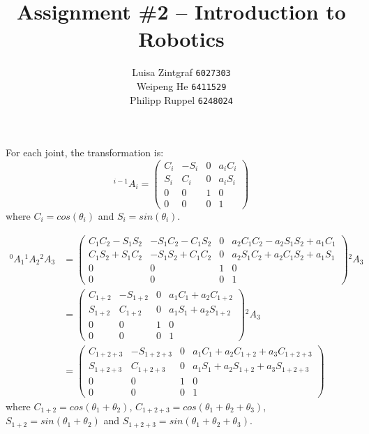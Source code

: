 \documentclass[a4paper,11pt]{article}
\title{Assignment \#2 -- Introduction to Robotics}
\author{
Luisa Zintgraf \texttt{6027303} \\
Weipeng He \texttt{6411529} \\
Philipp Ruppel \texttt{6248024}
}
\begin{document}
\maketitle

\section{}
\subsection{}
For each joint, the transformation is:
\[
  ^{i-1}A_{i} = 
  \begin{pmatrix}
    C_i & -S_i & 0 & a_iC_i \\
    S_i & C_i & 0 & a_iS_i \\
    0 & 0 & 1 & 0 \\
    0 & 0 & 0 & 1
  \end{pmatrix}
\]
where $C_i = cos(\theta_i)$ and $S_i = sin(\theta_i)$.

\begin{align*}
  ^{0}A_{1} {}^{1}A_{2} {}^{2}A_{3} &= 
  \begin{pmatrix}
    C_1C_2 - S_1S_2 & -S_1C_2 - C_1S_2 & 0 & a_2C_1C_2 - a_2S_1S_2 + a_1C_1 \\
    C_1S_2 + S_1C_2 & -S_1S_2 + C_1C_2 & 0 & a_2S_1C_2 + a_2C_1S_2 + a_1S_1 \\
    0 & 0 & 1 & 0 \\
    0 & 0 & 0 & 1
  \end{pmatrix}
  {}^{2}A_{3} \\
  &= 
  \begin{pmatrix}
    C_{1+2} & -S_{1+2} & 0 & a_1C_1 + a_2C_{1+2} \\
    S_{1+2} & C_{1+2} & 0 & a_1S_1 + a_2S_{1+2} \\
    0 & 0 & 1 & 0 \\
    0 & 0 & 0 & 1
  \end{pmatrix}
  {}^{2}A_{3}  \\
  &= 
  \begin{pmatrix}
    C_{1+2+3} & -S_{1+2+3} & 0 & a_1C_1 + a_2C_{1+2} + a_3C_{1+2+3} \\
    S_{1+2+3} & C_{1+2+3} & 0 & a_1S_1 + a_2S_{1+2} + a_3S_{1+2+3} \\
    0 & 0 & 1 & 0 \\
    0 & 0 & 0 & 1
  \end{pmatrix}
\end{align*}
where $C_{1+2} = cos(\theta_1 + \theta_2)$, $C_{1+2+3} = cos(\theta_1 + \theta_2 + \theta_3)$, $S_{1+2} = sin(\theta_1 + \theta_2)$ and $S_{1+2+3} = sin(\theta_1 + \theta_2 + \theta_3)$. 
\end{document}
